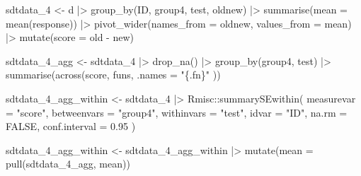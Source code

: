 \documentclass[
  man,floatsintext]{apa7}
\newenvironment{Shaded}{\begin{snugshade}}{\end{snugshade}}
\newcommand{\AttributeTok}[1]{\textcolor[rgb]{0.77,0.63,0.00}{#1}}
\newcommand{\ConstantTok}[1]{\textcolor[rgb]{0.00,0.00,0.00}{#1}}
\newcommand{\FloatTok}[1]{\textcolor[rgb]{0.00,0.00,0.81}{#1}}
\newcommand{\FunctionTok}[1]{\textcolor[rgb]{0.00,0.00,0.00}{#1}}
\newcommand{\NormalTok}[1]{#1}
\newcommand{\OtherTok}[1]{\textcolor[rgb]{0.56,0.35,0.01}{#1}}
\newcommand{\SpecialCharTok}[1]{\textcolor[rgb]{0.00,0.00,0.00}{#1}}
\newcommand{\StringTok}[1]{\textcolor[rgb]{0.31,0.60,0.02}{#1}}
\begin{document}
\begin{Shaded}
\begin{Highlighting}[]
\NormalTok{sdtdata\_4 }\OtherTok{\textless{}{-}}\NormalTok{ d }\SpecialCharTok{|\textgreater{}}
  \FunctionTok{group\_by}\NormalTok{(ID, group4, test, oldnew) }\SpecialCharTok{|\textgreater{}}
  \FunctionTok{summarise}\NormalTok{(}\AttributeTok{mean =} \FunctionTok{mean}\NormalTok{(response)) }\SpecialCharTok{|\textgreater{}}
  \FunctionTok{pivot\_wider}\NormalTok{(}\AttributeTok{names\_from =}\NormalTok{ oldnew, }\AttributeTok{values\_from =}\NormalTok{ mean) }\SpecialCharTok{|\textgreater{}}
  \FunctionTok{mutate}\NormalTok{(}\AttributeTok{score =}\NormalTok{ old }\SpecialCharTok{{-}}\NormalTok{ new)}

\NormalTok{sdtdata\_4\_agg }\OtherTok{\textless{}{-}}\NormalTok{ sdtdata\_4 }\SpecialCharTok{|\textgreater{}}
  \FunctionTok{drop\_na}\NormalTok{() }\SpecialCharTok{|\textgreater{}}
  \FunctionTok{group\_by}\NormalTok{(group4, test) }\SpecialCharTok{|\textgreater{}}
  \FunctionTok{summarise}\NormalTok{(}\FunctionTok{across}\NormalTok{(score, funs,}
    \AttributeTok{.names =} \StringTok{"\{.fn\}"}
\NormalTok{  ))}

\NormalTok{sdtdata\_4\_agg\_within }\OtherTok{\textless{}{-}}\NormalTok{ sdtdata\_4 }\SpecialCharTok{|\textgreater{}}
\NormalTok{  Rmisc}\SpecialCharTok{::}\FunctionTok{summarySEwithin}\NormalTok{(}
    \AttributeTok{measurevar =} \StringTok{"score"}\NormalTok{,}
    \AttributeTok{betweenvars =} \StringTok{"group4"}\NormalTok{,}
    \AttributeTok{withinvars =} \StringTok{"test"}\NormalTok{,}
    \AttributeTok{idvar =} \StringTok{"ID"}\NormalTok{,}
    \AttributeTok{na.rm =} \ConstantTok{FALSE}\NormalTok{,}
    \AttributeTok{conf.interval =} \FloatTok{0.95}
\NormalTok{  )}

\NormalTok{sdtdata\_4\_agg\_within }\OtherTok{\textless{}{-}}\NormalTok{ sdtdata\_4\_agg\_within }\SpecialCharTok{|\textgreater{}}
  \FunctionTok{mutate}\NormalTok{(}\AttributeTok{mean =} \FunctionTok{pull}\NormalTok{(sdtdata\_4\_agg, mean))}


\end{Highlighting}
\end{Shaded}
\end{document}
